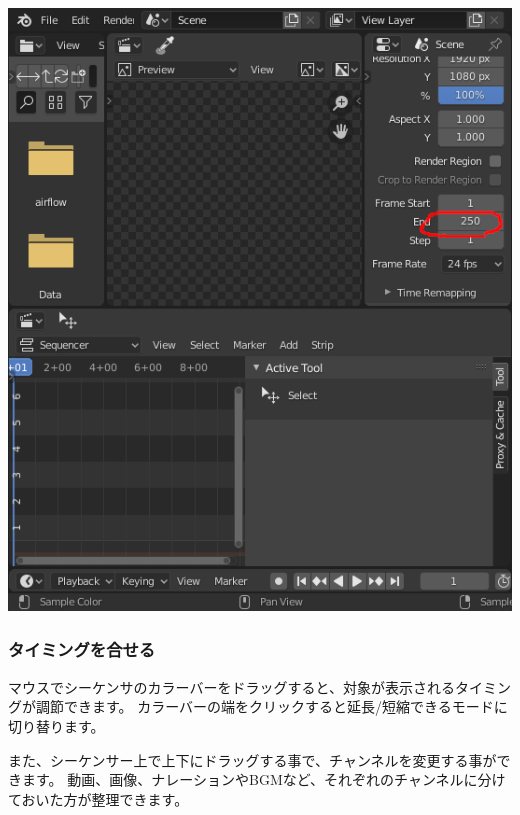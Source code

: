 \documentclass[mingoth,a4paper]{jsarticle}
\begin{document}
\begin{center}
\includegraphics[scale=0.3]{image202209/blender_change_end.png}
\end{center}

\subsubsection{タイミングを合せる}

マウスでシーケンサのカラーバーをドラッグすると、対象が表示されるタイミングが調節できます。
カラーバーの端をクリックすると延長/短縮できるモードに切り替ります。

また、シーケンサー上で上下にドラッグする事で、チャンネルを変更する事ができます。
動画、画像、ナレーションやBGMなど、それぞれのチャンネルに分けておいた方が整理できます。
\end{document}
